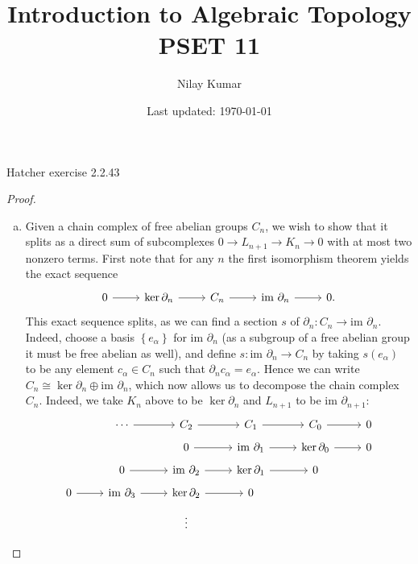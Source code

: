 \documentclass{../../mathnotes}
\title{Introduction to Algebraic Topology PSET 11}
\author{Nilay Kumar}
\date{Last updated: \today}
\begin{document}
\maketitle

\begin{prop}
    Hatcher exercise 2.2.43
\end{prop}
\begin{proof} \hfill
    \begin{enumerate}[(a)]
        \item Given a chain complex of free abelian groups $C_n$, we wish to show that it
            splits as a direct sum of subcomplexes $0\to L_{n+1}\to K_n\to 0$ with at most two
            nonzero terms. First note that for any $n$ the first isomorphism theorem yields the
            exact sequence
            \begin{equation*}
                \begin{tikzcd}
                    0\ar{r} & \ker \partial_n\ar{r} & C_n\ar{r} & \text{im }\partial_n\ar{r} & 0.
                \end{tikzcd}
            \end{equation*}
            This exact sequence splits, as we can find a section $s$ of $\partial_n:C_n\to\text{im }\partial_n$.
            Indeed, choose a basis $\left\{ e_\alpha \right\}$ for $\text{im }\partial_n$ (as a subgroup of a free abelian group it must
            be free abelian as well), and define $s:\text{im }\partial_n\to C_n$ by taking $s(e_\alpha)$ to be
            any element $c_\alpha\in C_n$ such that $\partial_nc_\alpha=e_\alpha$. Hence we can write
            $C_n\cong \ker \partial_n\oplus \text{im }\partial_n$, which now allows us to decompose the chain
            complex $C_n$. Indeed, we take $K_n$ above to be $\ker \partial_n$ and $L_{n+1}$ to be $\text{im }\partial_{n+1}$:
            \begin{equation*}
                \begin{tikzcd}[row sep=tiny]
                    \;&\cdots\ar{r} & C_2\ar{r} & C_1\ar{r} & C_0\ar{r} & 0\\
                    \;&\;& 0\ar{r} & \text{im }\partial_1\ar{r} & \ker \partial_0\ar{r} & 0\\
                    \;& 0\ar{r} & \text{im }\partial_2\ar{r} & \ker\partial_1\ar{r} & 0\\
                    0\ar{r} & \text{im }\partial_3\ar{r} & \ker\partial_2\ar{r} & 0\\
                    \; & \; & \vdots
                \end{tikzcd}

\end{equation*}
\end{enumerate}
\end{proof}
\end{document}
